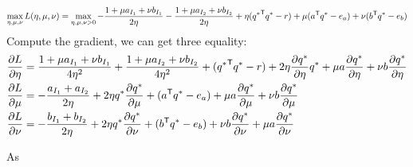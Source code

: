 \begin{equation}
\max_{\eta,\mu,\nu}  L(\eta,\mu,\nu) = \max_{\eta,\mu,\nu>0} -\frac{1+\mu a_{I_1} + \nu b_{I_1}}{2\eta}  -\frac{1+\mu a_{I_2} + \nu b_{I_2}}{2\eta}+ \eta({q^{*}}^{\mathsf T}q^{*}-r )+\mu( a^{\mathsf T}q^{*} - e_a ) + \nu( b^{\mathsf T}q^{*} - e_b )
\end{equation}
Compute the gradient, we can get three equality:
\begin{equation}
\begin{split} 
\frac{\partial L}{\partial \eta} &= \frac{1+\mu a_{I_1} + \nu b_{I_1}}{4\eta^2} +  \frac{1+\mu a_{I_2} + \nu b_ {I_2}}{4\eta^2} + ( {q^{*}}^{\mathsf T}q^{*} -r) + 2\eta\frac{\partial q^{*}}{\partial \eta}q^{*} +\mu a \frac{\partial q^{*}}{\partial \eta} + \nu b \frac{\partial q^{*}}{\partial \eta}\\
\frac{\partial L}{\partial \mu} &= -\frac{a_{I_1} + a_{I_2}}{2\eta} + 2 \eta q^{*}\frac{\partial q^{*}}{\partial \mu} +( a^{\mathsf T}q^{*} - e_a ) + \mu a \frac{\partial q^{*}}{\partial \mu} + \nu b \frac{\partial q^{*}}{\partial \mu} \\
\frac{\partial L}{\partial \nu} &= -\frac{b_{I_1} + b_{I_2}}{2\eta} + 2 \eta q^{*}\frac{\partial q^{*}}{\partial \nu} +( b^{\mathsf T}q^{*} - e_b ) + \nu b \frac{\partial q^{*}}{\partial \nu} + \mu a \frac{\partial q^{*}}{\partial \nu} 
 \end{split}
\end{equation}

As 


